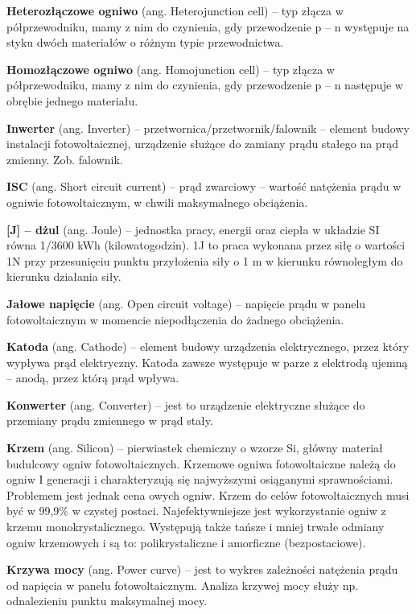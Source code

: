 \documentclass[12pt,a4paper]{article}
\begin{document}
\textbf{Heterozłączowe ogniwo} (ang. Heterojunction cell) – typ złącza w półprzewodniku, mamy z nim do czynienia, gdy przewodzenie p – n występuje na styku dwóch materiałów o różnym typie przewodnictwa.

\textbf{Homozłączowe ogniwo} (ang. Homojunction cell) – typ złącza w półprzewodniku, mamy z nim do czynienia, gdy przewodzenie p – n następuje w obrębie jednego materiału.


\textbf{Inwerter} (ang. Inverter) – przetwornica/przetwornik/falownik – element budowy instalacji fotowoltaicznej, urządzenie służące do zamiany prądu stałego na prąd zmienny. Zob. falownik.

\textbf{ISC} (ang. Short circuit current) – prąd zwarciowy – wartość natężenia prądu w ogniwie fotowoltaicznym, w chwili maksymalnego obciążenia.

\textbf{[J] – dżul} (ang. Joule) – jednostka pracy, energii oraz ciepła w układzie SI równa 1/3600 kWh (kilowatogodzin). 1J to praca wykonana przez siłę o wartości 1N przy przesunięciu punktu przyłożenia siły o 1 m w kierunku równoległym do kierunku działania siły.

\textbf{Jałowe napięcie} (ang. Open circuit voltage) – napięcie prądu w panelu fotowoltaicznym w momencie niepodłączenia do żadnego obciążenia.

\textbf{Katoda} (ang. Cathode) – element budowy urządzenia elektrycznego, przez który wypływa prąd elektryczny. Katoda zawsze występuje w parze z elektrodą ujemną – anodą, przez którą prąd wpływa.

\textbf{Konwerter} (ang. Converter) – jest to urządzenie elektryczne służące do przemiany prądu zmiennego w prąd stały.

\textbf{Krzem} (ang. Silicon) – pierwiastek chemiczny o wzorze Si, główny materiał budulcowy ogniw fotowoltaicznych.  Krzemowe ogniwa fotowoltaiczne należą do ogniw I generacji i charakteryzują się najwyższymi osiąganymi sprawnościami. Problemem jest jednak cena owych ogniw. Krzem do celów fotowoltaicznych musi być w 99,9\% w czystej postaci. Najefektywniejsze jest wykorzystanie ogniw z krzemu monokrystalicznego. Występują także tańsze i mniej trwałe odmiany ogniw krzemowych i są to: polikrystaliczne i amorficzne (bezpostaciowe).

\textbf{Krzywa mocy} (ang. Power curve)  – jest to wykres zależności natężenia prądu od napięcia w panelu fotowoltaicznym. Analiza krzywej mocy służy np. odnalezieniu punktu maksymalnej mocy.
\end{document}
